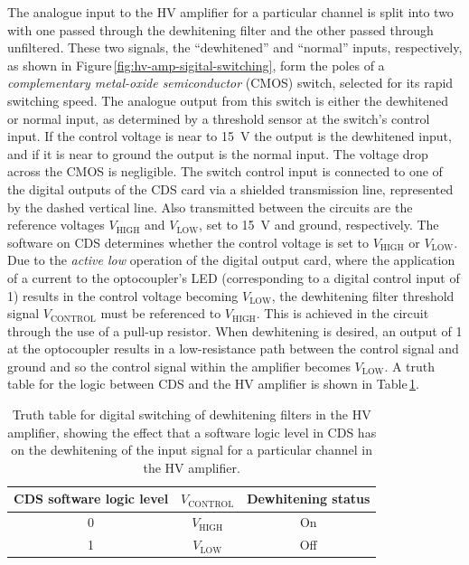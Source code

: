 The analogue input to the \gls{HV} amplifier for a particular channel is split into two with one passed through the dewhitening filter and the other passed through unfiltered. These two signals, the ``dewhitened'' and ``normal'' inputs, respectively, as shown in Figure\,\ref{fig:hv-amp-sigital-switching}, form the poles of a \emph{complementary metal-oxide semiconductor} (\gls{CMOS}) switch, selected for its rapid switching speed. The analogue output from this switch is either the dewhitened or normal input, as determined by a threshold sensor at the switch's control input. If the control voltage is near to \SI{15}{\volt} the output is the dewhitened input, and if it is near to ground the output is the normal input. The voltage drop across the \gls{CMOS} is negligible. The switch control input is connected to one of the digital outputs of the \gls{CDS} card via a shielded transmission line, represented by the dashed vertical line. Also transmitted between the circuits are the reference voltages $V_{\text{HIGH}}$ and $V_{\text{LOW}}$, set to \SI{15}{\volt} and ground, respectively. The software on \gls{CDS} determines whether the control voltage is set to $V_{\text{HIGH}}$ or $V_{\text{LOW}}$. Due to the \emph{active low} operation of the digital output card, where the application of a current to the optocoupler's \gls{LED} (corresponding to a digital control input of \num{1}) results in the control voltage becoming $V_{\text{LOW}}$, the dewhitening filter threshold signal $V_{\text{CONTROL}}$ must be referenced to $V_{\text{HIGH}}$. This is achieved in the circuit through the use of a pull-up resistor. When dewhitening is desired, an output of \num{1} at the optocoupler results in a low-resistance path between the control signal and ground and so the control signal within the amplifier becomes $V_{\text{LOW}}$. A truth table for the logic between \gls{CDS} and the \gls{HV} amplifier is shown in Table\,\ref{tab:digital-dewhitening-truth-table}.

\begin{table}
  \centering
  {\renewcommand{\arraystretch}{1.2} %
    \begin{tabular}{c|c|c}
      \textbf{\gls{CDS} software logic level} & \textbf{$V_{\text{CONTROL}}$} & \textbf{Dewhitening status} \\
      \hline
      0 & $V_{\text{HIGH}}$ & On \\
      1 & $V_{\text{LOW}}$ & Off
    \end{tabular}
  }
  \caption[Truth table for digital switching of dewhitening filters in the high voltage amplifier]{\label{tab:digital-dewhitening-truth-table}Truth table for digital switching of dewhitening filters in the \gls{HV} amplifier, showing the effect that a software logic level in \gls{CDS} has on the dewhitening of the input signal for a particular channel in the \gls{HV} amplifier.}
\end{table}

